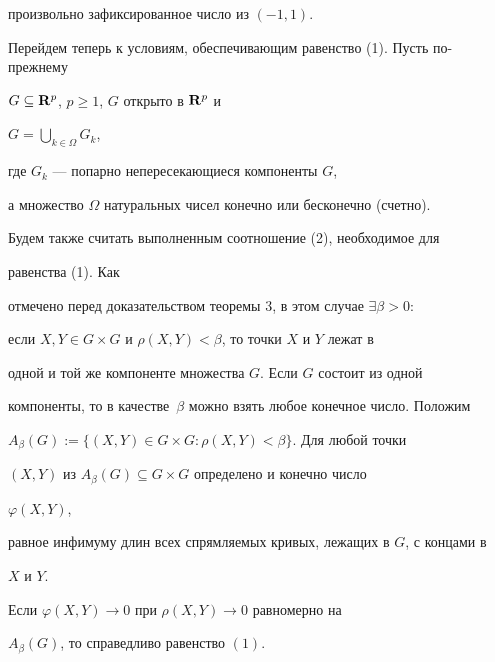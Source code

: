 произвольно зафиксированное число из $(-1,1)$.





Перейдем теперь к условиям, обеспечивающим равенство (1). Пусть по-прежнему


$G\subseteq {\bold R}^p$, $p\geqslant 1$, $G$ открыто в ${\bold R}^p$ и


$G=\bigcup\limits_{k\in \Omega}G_k$,


где $G_k$ --- попарно непересекающиеся компоненты $G$,


а множество $\Omega$  натуральных чисел конечно или бесконечно (счетно).


Будем также считать выполненным соотношение (2), необходимое для 


равенства (1). Как


отмечено перед доказательством теоремы 3, в этом случае $\exists \beta>0:$


если $X,Y\in G\times G$ и $\rho (X,Y)<\beta$, то точки $X$ и $Y$ лежат в


одной и той же компоненте множества $G$. Если $G$ состоит из одной 


компоненты, то в качестве~$\beta$ можно взять любое конечное число. Положим


$A_{\beta}(G):=\{(X,Y)\in G\times G:\rho(X,Y)<\beta\}$. Для любой точки


$(X,Y)$ из $A_{\beta}(G)\subseteq G\times G$ определено и конечно число


$\varphi(X,Y)$,


равное инфимуму длин всех спрямляемых кривых, лежащих в $G$, с концами в


$X$ и $Y$.








\begin{thm}


Если $\varphi(X,Y)\to 0$ при $\rho(X,Y)\to 0$ равномерно на


$A_{\beta}(G)$, то справедливо равенство $(1)$.


\end{thm}









